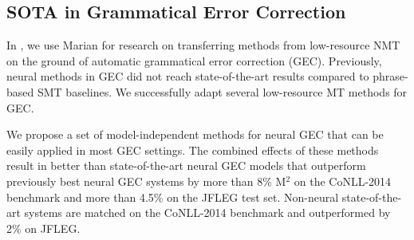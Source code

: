 \documentclass[11pt,a4paper]{article}
\begin{document}
\subsection{SOTA in Grammatical Error Correction}

In , we use Marian for research on transferring methods from low-resource NMT on the ground of automatic grammatical error correction (GEC).
Previously, neural methods in GEC did not reach state-of-the-art results compared to phrase-based SMT baselines. We successfully adapt several low-resource MT methods for GEC.
  
We propose a set of model-independent methods for neural GEC that can be easily applied in most GEC settings.
The combined effects of these methods result in better than state-of-the-art neural GEC models that outperform previously best neural GEC systems by more than 8\% M$^2$ on the CoNLL-2014 benchmark and more than 4.5\% on the JFLEG test set. Non-neural state-of-the-art systems are matched on the CoNLL-2014 benchmark and outperformed by 2\% on JFLEG.
\end{document}
